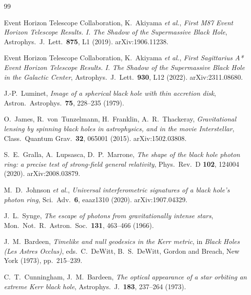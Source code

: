 \begin{thebibliography}{99}
\small

Event Horizon Telescope Collaboration, K.~Akiyama \emph{et al.},
\emph{First M87 Event Horizon Telescope Results. I. The Shadow of the
Supermassive Black Hole}, Astrophys.\ J.\ Lett.\ \textbf{875}, L1 (2019).
arXiv:1906.11238.

Event Horizon Telescope Collaboration, K.~Akiyama \emph{et al.},
\emph{First Sagittarius A* Event Horizon Telescope Results. I. The Shadow of the
Supermassive Black Hole in the Galactic Center},
Astrophys.\ J.\ Lett.\ \textbf{930}, L12 (2022). arXiv:2311.08680.

J.-P.~Luminet,
\emph{Image of a spherical black hole with thin accretion disk},
Astron.\ Astrophys.\ \textbf{75}, 228--235 (1979).

O.~James, R.~von~Tunzelmann, H.~Franklin, A.~R.~Thackeray,
\emph{Gravitational lensing by spinning black holes in astrophysics, and in the
movie Interstellar}, Class.\ Quantum Grav.\ \textbf{32}, 065001 (2015).
arXiv:1502.03808.

S.~E.~Gralla, A.~Lupsasca, D.~P.~Marrone,
\emph{The shape of the black hole photon ring: a precise test of strong-field
general relativity}, Phys.\ Rev.\ D \textbf{102}, 124004 (2020).
arXiv:2008.03879.

M.~D.~Johnson \emph{et al.},
\emph{Universal interferometric signatures of a black hole's photon ring},
Sci.\ Adv.\ \textbf{6}, eaaz1310 (2020). arXiv:1907.04329.

J.~L.~Synge,
\emph{The escape of photons from gravitationally intense stars},
Mon.\ Not.\ R.\ Astron.\ Soc.\ \textbf{131}, 463--466 (1966).

J.~M.~Bardeen,
\emph{Timelike and null geodesics in the Kerr metric}, in
\emph{Black Holes (Les Astres Occlus)}, eds.\ C.~DeWitt, B.~S.~DeWitt,
Gordon and Breach, New York (1973), pp.~215--239.

C.~T.~Cunningham, J.~M.~Bardeen,
\emph{The optical appearance of a star orbiting an extreme Kerr black hole},
Astrophys.\ J.\ \textbf{183}, 237--264 (1973).


\end{thebibliography}
